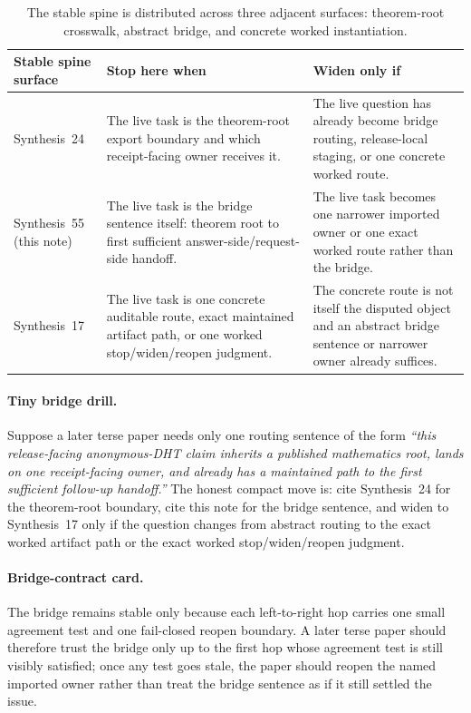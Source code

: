 \documentclass[11pt]{article}
\begin{document}
\begin{table}[t]
\centering
\small
\begin{tabularx}{\linewidth}{@{}lX X@{}}
\toprule
Stable spine surface & Stop here when & Widen only if \\
\midrule
Synthesis~24 & The live task is the theorem-root export boundary and which receipt-facing owner receives it. & The live question has already become bridge routing, release-local staging, or one concrete worked route. \\
Synthesis~55 (this note) & The live task is the bridge sentence itself: theorem root to first sufficient answer-side/request-side handoff. & The live task becomes one narrower imported owner or one exact worked route rather than the bridge. \\
Synthesis~17 & The live task is one concrete auditable route, exact maintained artifact path, or one worked stop/widen/reopen judgment. & The concrete route is not itself the disputed object and an abstract bridge sentence or narrower owner already suffices. \\
\bottomrule
\end{tabularx}
\caption{The stable spine is distributed across three adjacent surfaces: theorem-root crosswalk, abstract bridge, and concrete worked instantiation.}
\label{tab:seriesspine-three-surface}
\end{table}

\paragraph{Tiny bridge drill.}
Suppose a later terse paper needs only one routing sentence of the form \emph{``this release-facing anonymous-DHT claim inherits a published mathematics root, lands on one receipt-facing owner, and already has a maintained path to the first sufficient follow-up handoff.''} The honest compact move is: cite Synthesis~24 for the theorem-root boundary, cite this note for the bridge sentence, and widen to Synthesis~17 only if the question changes from abstract routing to the exact worked artifact path or the exact worked stop/widen/reopen judgment.\cite{series:mathcrosswalk,series:workedexample}

\paragraph{Bridge-contract card.}
The bridge remains stable only because each left-to-right hop carries one small agreement test and one fail-closed reopen boundary.
A later terse paper should therefore trust the bridge only up to the first hop whose agreement test is still visibly satisfied; once any test goes stale, the paper should reopen the named imported owner rather than treat the bridge sentence as if it still settled the issue.
\end{document}
